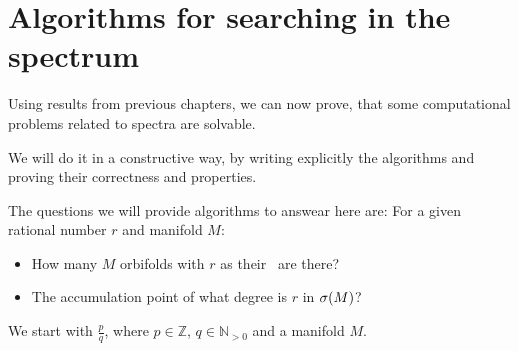 \chapter{Algorithms for searching in the spectrum}

Using results from previous chapters, we can now prove, that some computational problems related 
to spectra are solvable.

We will do it in a constructive way, by writing explicitly the algorithms and proving their 
correctness and properties.

The questions we will provide algorithms to answear here are: 
For a given rational number $r$ and manifold $M$:
\begin{itemize}
\item How many $M$ orbifolds with $r$ as their \Eoc\ are there?
\item The accumulation point of what degree is $r$ in ${\sigma}(M)$?
\end{itemize}


We start with $\frac{p}{q}$, where $p \in \mathbb{Z}$, $q \in \mathbb{N}_{>0}$ and a manifold $M$. 

